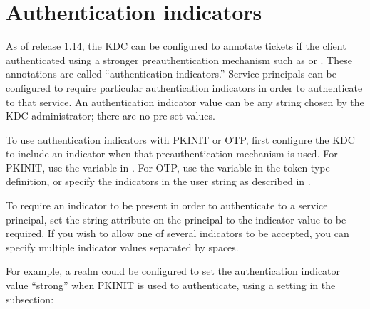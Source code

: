 \documentclass[letterpaper,10pt,english]{sphinxmanual}
\begin{document}
\chapter{Authentication indicators}
\label{\detokenize{admin/auth_indicator:auth-indicator}}\label{\detokenize{admin/auth_indicator:authentication-indicators}}\label{\detokenize{admin/auth_indicator::doc}}
As of release 1.14, the KDC can be configured to annotate tickets if
the client authenticated using a stronger preauthentication mechanism
such as {\hyperref[\detokenize{admin/pkinit:pkinit}]{}} or {\hyperref[\detokenize{admin/otp:otp-preauth}]{}}.  These
annotations are called “authentication indicators.”  Service
principals can be configured to require particular authentication
indicators in order to authenticate to that service.  An
authentication indicator value can be any string chosen by the KDC
administrator; there are no pre-set values.

To use authentication indicators with PKINIT or OTP, first configure
the KDC to include an indicator when that preauthentication mechanism
is used.  For PKINIT, use the  variable in
{\hyperref[\detokenize{admin/conf_files/kdc_conf:kdc-conf-5}]{}}.  For OTP, use the  variable in the
token type definition, or specify the indicators in the  user
string as described in {\hyperref[\detokenize{admin/otp:otp-preauth}]{}}.

To require an indicator to be present in order to authenticate to a
service principal, set the  string attribute on the
principal to the indicator value to be required.  If you wish to allow
one of several indicators to be accepted, you can specify multiple
indicator values separated by spaces.

For example, a realm could be configured to set the authentication
indicator value “strong” when PKINIT is used to authenticate, using a
setting in the {\hyperref[\detokenize{admin/conf_files/kdc_conf:kdc-realms}]{}} subsection:

%
\begin{sphinxVerbatim}[commandchars=\\\{\}]
  
\end{sphinxVerbatim}
\end{document}
